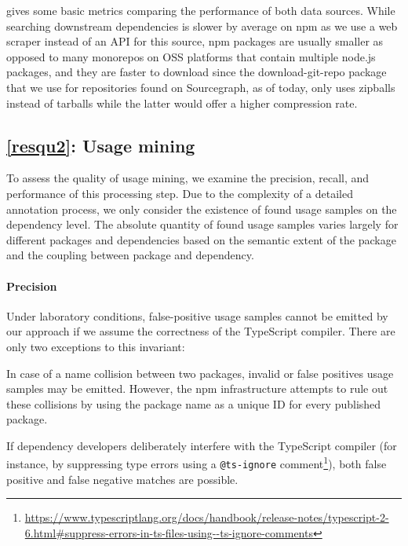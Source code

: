  gives some basic metrics comparing the performance of both data sources.
While searching downstream dependencies is slower by average on npm as we use a web scraper instead of an API for this source, npm packages are usually smaller as opposed to many monorepos on OSS platforms that contain multiple node.js packages, and they are faster to download since the download-git-repo package that we use for repositories found on Sourcegraph, as of today, only uses zipballs instead of tarballs while the latter would offer a higher compression rate.

\subsection{\ref{resqu2}: Usage mining}
\label{sec:evaluation/resqu2}

To assess the quality of usage mining, we examine the precision, recall, and performance of this processing step.
Due to the complexity of a detailed annotation process, we only consider the existence of found usage samples on the dependency level.
The absolute quantity of found usage samples varies largely for different packages and dependencies based on the semantic extent of the package and the coupling between package and dependency.

\paragraph{Precision}
\label{sec:evaluation/resqu2/precision}

Under laboratory conditions, false-positive usage samples cannot be emitted by our approach if we assume the correctness of the TypeScript compiler.
There are only two exceptions to this invariant:
\begin{enumerate*}[label=(\roman*)]
	\item In case of a name collision between two packages, invalid or false positives usage samples may be emitted.
		However, the npm infrastructure attempts to rule out these collisions by using the package name as a unique ID for every published package.
	\item If dependency developers deliberately interfere with the TypeScript compiler (for instance, by suppressing type errors using a \verb|@ts-ignore| comment\footnote{\url{https://www.typescriptlang.org/docs/handbook/release-notes/typescript-2-6.html\#suppress-errors-in-ts-files-using--ts-ignore-comments}}), both false positive and false negative matches are possible.
\end{enumerate*}

